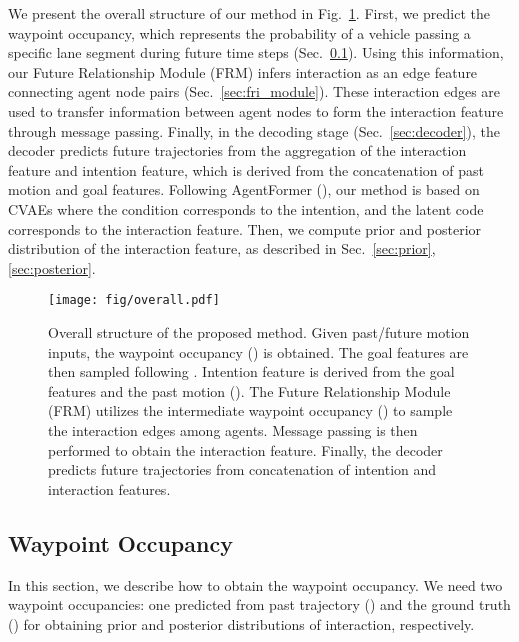 \documentclass{article} \usepackage{iclr2023_conference,times}
\begin{document}
We present the overall structure of our method in Fig.~\ref{fig:overall}.
First, we predict the waypoint occupancy, which represents the probability of a vehicle passing a specific lane segment during future time steps  (Sec.~\ref{sec:waypoint_prediction}).
Using this information, our Future Relationship Module (FRM) infers interaction as an edge feature connecting agent node pairs (Sec.~\ref{sec:fri_module}).
These interaction edges are used to transfer information between agent nodes to form the interaction feature through message passing.
Finally, in the decoding stage (Sec.~\ref{sec:decoder}), the decoder predicts future trajectories from the aggregation of the interaction feature and intention feature, which is derived from the concatenation of past motion and goal features.
Following AgentFormer (\cite{yuan2021agentformer}), our method is based on CVAEs 
where the condition corresponds to the intention, and the latent code corresponds to the interaction feature.
Then, we compute prior and posterior distribution of the interaction feature, as described in Sec.~\ref{sec:prior}, \ref{sec:posterior}.

\begin{figure}
  \centering
  \hspace*{-0.0\linewidth}\texttt{[image: fig/overall.pdf]}
  \vspace{-12pt}
  \caption{Overall structure of the proposed method. Given past/future motion inputs, the waypoint occupancy () is obtained. The goal features are then sampled following . Intention feature is derived from the goal features and the past motion (). The Future Relationship Module (FRM) utilizes the intermediate waypoint occupancy () to sample the interaction edges among agents. Message passing is then performed to obtain the interaction feature. Finally, the decoder predicts  future trajectories from concatenation of intention and interaction features.
  }  
  \label{fig:overall}
  \vspace{-7pt}
\end{figure}

\subsection{Waypoint Occupancy}
\label{sec:waypoint_prediction}
In this section, we describe how to obtain the waypoint occupancy. 
We need two waypoint occupancies: one predicted from past trajectory () and the ground truth () for obtaining prior and posterior distributions of interaction, respectively. 
\end{document}
